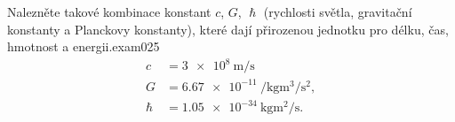 \begin{fyzexam}{Nalezněte takové kombinace konstant \(c\), \(G\), \(\hslash\) (rychlosti světla,
  gravitační konstanty a Planckovy konstanty), které dají přirozenou jednotku pro délku, čas,
  hmotnost a energii.}{exam025}  
    \begin{subequations}\label{fyz:eq750} 
      \begin{align}
        c       &= \qty{3e8}{\m\per\s}                              \label{fyz:eq750a}  \\
        G       &= \qty{6,67e-11}{\per\kg\cubic\m\per\square\s},    \label{fyz:eq750b}  \\
        \hslash &= \qty{1,05e-34}{\kg\square\m\per\s} .             \label{fyz:eq750c}
      \end{align}
    \end{subequations}


\end{fyzexam}
